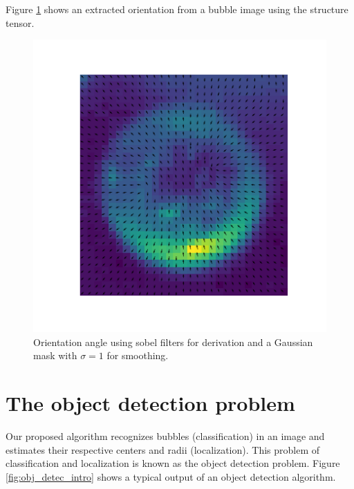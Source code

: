 		Figure \ref{fig:struct_tensor_demo} shows an extracted orientation from a bubble image using the structure tensor.
		\begin{figure}
			\centering
			\includegraphics[scale=0.4]{images/structure_tensor_demo.png}
			\caption{Orientation angle using sobel filters for derivation and a Gaussian mask with $\sigma =1$ for smoothing.}
			\label{fig:struct_tensor_demo}
		\end{figure}
		
	
	\section{The object detection problem}\label{the_object_detection_problem}
	
	Our proposed algorithm recognizes bubbles (classification) in an image and estimates their respective centers and radii (localization). This problem of classification and localization is known as the object detection problem. Figure \ref{fig:obj_detec_intro} shows a typical output of an object detection algorithm. 
	
